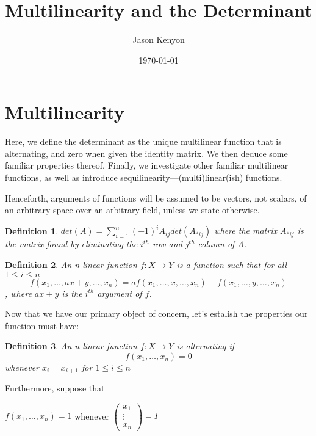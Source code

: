 \documentclass{article}
\title{Multilinearity and the Determinant}
\date{\today}
\author{Jason Kenyon}
\newtheorem{defn}{Definition}
\begin{document}
\maketitle
\section{Multilinearity}
Here, we define the determinant as the unique multilinear function that is alternating, and zero when given the identity matrix.
We then deduce some familiar properties thereof. Finally, we investigate other familiar multilinear functions, as well as introduce sequilinearity---(multi)linear(ish) functions. 

Henceforth, arguments of functions will be assumed to be vectors, not scalars, of an arbitrary space over an arbitrary field,
unless we state otherwise.
\begin{defn}
$det(A)=\sum_{i=1}^{n}(-1)^iA_{ij}det(A_{*ij})$ where the matrix $A_{*ij}$ is the matrix found by eliminating the $i^{th}$ row and $j^{th}$ column of A.
\end{defn}
\begin{defn}
An n-linear function $f:X \to Y$ is a function such that for all $1\leq i\leq n$ 
$$f(x_1, \dots, ax+y, \dots, x_n)=af(x_1, \dots, x, \dots, x_n)+f(x_1,\dots, y,\dots,x_n)$$,
where $ax+y$ is the $i^{th}$ argument of $f$.
\end{defn}
Now that we have our primary object of concern, let's estalish the properties our function must have:
\begin{defn}
An n linear function $f:X \to Y$ is alternating if $$f(x_1, \dots, x_n)=0$$ whenever $x_i=x_{i+1}$ for $1\leq i\leq n$
	
\end{defn}
Furthermore, suppose that 

$f(x_1, \dots, x_n)=1$ whenever $\begin{pmatrix}
x_1 \\
\vdots \\
x_n
\end{pmatrix}=I$
\end{document}
